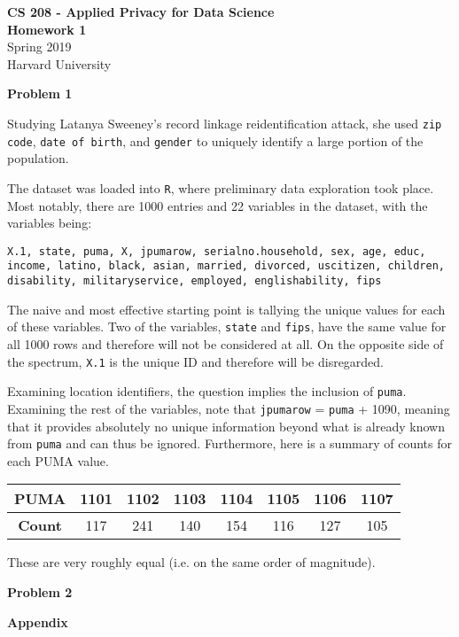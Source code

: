 \documentclass[12pt]{article}
\begin{document}
\begin{center}
	{\Large \textbf{CS 208 - Applied Privacy for Data Science}}\\
	{\Large \textbf{Homework 1}}\\
	\vspace*{0.1in}
	Spring 2019\\
	Harvard University\\
\end{center}

{\large\textbf{Problem 1}}

Studying Latanya Sweeney's record linkage reidentification attack, she used \texttt{zip code}, \texttt{date of birth}, and \texttt{gender} to uniquely identify a large portion of the population.

The dataset was loaded into \texttt{R}, where preliminary data exploration took place. Most notably, there are 1000 entries and 22 variables in the dataset, with the variables being:
\begin{center}
\texttt{X.1, state, puma, X, jpumarow, serialno.household, sex, age, educ, income, latino, black, asian, married, divorced, uscitizen, children, disability, militaryservice, employed, englishability, fips}
\end{center}
The naive and most effective starting point is tallying the unique values for each of these variables. Two of the variables, \texttt{state} and \texttt{fips}, have the same value for all 1000 rows and therefore will not be considered at all. On the opposite side of the spectrum, \texttt{X.1} is the unique ID and therefore will be disregarded.

Examining location identifiers, the question implies the inclusion of \texttt{puma}. Examining the rest of the variables, note that \texttt{jpumarow} = \texttt{puma} + 1090, meaning that it provides absolutely no unique information beyond what is already known from \texttt{puma} and can thus be ignored. Furthermore, here is a summary of counts for each PUMA value.
\begin{center}
\begin{tabular}{|c|ccccccc|}
\hline
\textbf{PUMA} & 1101 & 1102 & 1103 & 1104 & 1105 & 1106 & 1107\\\hline
\textbf{Count} & 117 & 241 & 140 & 154 & 116 & 127 & 105\\ \hline
\end{tabular}
\end{center}
These are very roughly equal (i.e. on the same order of magnitude). 


{\large\textbf{Problem 2}}



{\large\textbf{Appendix}}

\begin{lstlisting}

\end{lstlisting}
\end{document}
